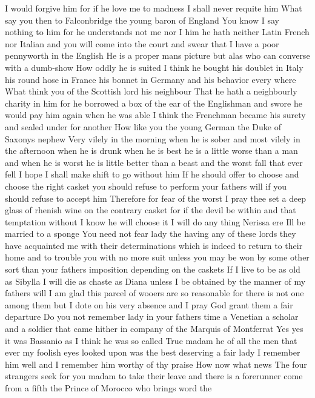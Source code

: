 I would forgive him for if he love me to madness I 
shall never requite him 
What say you then to Falconbridge the young baron 
of England 
You know I say nothing to him for he understands 
not me nor I him he hath neither Latin French 
nor Italian and you will come into the court and 
swear that I have a poor pennyworth in the English 
He is a proper mans picture but alas who can 
converse with a dumb-show How oddly he is suited 
I think he bought his doublet in Italy his round 
hose in France his bonnet in Germany and his 
behavior every where 
What think you of the Scottish lord his neighbour 
That he hath a neighbourly charity in him for he 
borrowed a box of the ear of the Englishman and 
swore he would pay him again when he was able I 
think the Frenchman became his surety and sealed 
under for another 
How like you the young German the Duke of Saxonys nephew 
Very vilely in the morning when he is sober and 
most vilely in the afternoon when he is drunk when 
he is best he is a little worse than a man and 
when he is worst he is little better than a beast 
and the worst fall that ever fell I hope I shall 
make shift to go without him 
If he should offer to choose and choose the right 
casket you should refuse to perform your fathers 
will if you should refuse to accept him 
Therefore for fear of the worst I pray thee set a 
deep glass of rhenish wine on the contrary casket 
for if the devil be within and that temptation 
without I know he will choose it I will do any 
thing Nerissa ere Ill be married to a sponge 
You need not fear lady the having any of these 
lords they have acquainted me with their 
determinations which is indeed to return to their 
home and to trouble you with no more suit unless 
you may be won by some other sort than your fathers 
imposition depending on the caskets 
If I live to be as old as Sibylla I will die as 
chaste as Diana unless I be obtained by the manner 
of my fathers will I am glad this parcel of wooers 
are so reasonable for there is not one among them 
but I dote on his very absence and I pray God grant 
them a fair departure 
Do you not remember lady in your fathers time a 
Venetian a scholar and a soldier that came hither 
in company of the Marquis of Montferrat 
Yes yes it was Bassanio as I think he was so called 
True madam he of all the men that ever my foolish 
eyes looked upon was the best deserving a fair lady 
I remember him well and I remember him worthy of 
thy praise 
How now what news 
The four strangers seek for you madam to take 
their leave and there is a forerunner come from a 
fifth the Prince of Morocco who brings word the 
